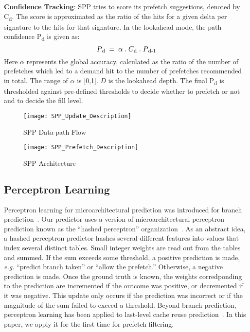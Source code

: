 \noindent \textbf{Confidence Tracking}: 
SPP tries to score its prefetch suggestions, denoted by C\textsubscript{d}.
The score is approximated as the ratio of the hits for a given delta per
signature to the hits for that signature. In the lookahead mode, the path
confidence P\textsubscript{d} is given as: $$P\textsubscript{d} \;=\; \alpha  
\;.\;  C\textsubscript{d}  \;.\; P\textsubscript{d-1}$$ Here $\alpha$ represents 
the global accuracy, calculated as the ratio of the number of prefetches which 
led to a demand hit to the number of prefetches recommended in total. The range
of $\alpha$ is [0,1].  $D$ is the lookahead depth. The final P\textsubscript{d} 
is thresholded against pre-defined thresholds to decide whether to prefetch or 
not and to decide the fill level.

\begin{figure}
  \begin{center}
  \texttt{[image: SPP\_Update\_Description]}
  \caption{SPP Data-path Flow}
  \label{fig:spp_update}
  \end{center}
\end{figure}


\begin{figure}
  \begin{center}
  \texttt{[image: SPP\_Prefetch\_Description]}
  \caption{SPP Architecture}
  \label{fig:spp_structure}
  \end{center}
\end{figure}

\subsection{Perceptron Learning}
\label{sec:Background-Perceptron}
Perceptron learning for microarchitectural prediction was introduced
for branch prediction~\cite{PerceptronPredictor}. Our predictor uses a
version of microarchitectural perceptron prediction known as the
``hashed perceptron'' organization~\cite{HashedPerceptron}. As an
abstract idea, a hashed perceptron predictor hashes several different
features into values that index several distinct tables. Small integer
weights are read out from the tables and summed. If the sum exceeds
some threshold, a positive prediction is made, {\em e.g.} ``predict
branch taken'' or ``allow the prefetch.'' Otherwise, a negative
prediction is made. Once the ground truth is known, the weights
corredponding to the prediction are incremented if the outcome was
positive, or decremented if it was negative. This update only occurs
if the prediction was incorrect or if the magnitude of the sum failed
to exceed a threshold.  Beyond branch prediction, perceptron learning
has been applied to last-level cache reuse
prediction~\cite{Perc_Reuse,Multiperspective}. In this paper, we apply
it for the first time for prefetch filtering.
